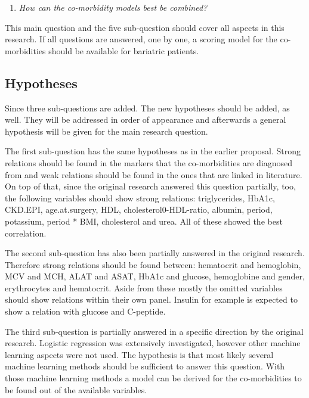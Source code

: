 \documentclass[10pt,a4paper]{article}
\begin{document}
	\begin{enumerate}[resume]
		\item \emph{How can the co-morbidity models best be combined?}
	\end{enumerate}
	
	This main question and the five sub-question should cover all aspects in this research. If all questions are answered, one by one, a scoring model for the co-morbidities should be available for bariatric patients.
	
	\subsection{Hypotheses}
	
	Since three sub-questions are added. The new hypotheses should be added, as well. They will be addressed in order of appearance and afterwards a general hypothesis will be given for the main research question.
	
	The first sub-question has the same hypotheses as in the earlier proposal. Strong relations should be found in the markers that the co-morbidities are diagnosed from and weak relations should be found in the ones that are linked in literature. On top of that, since the original research answered this question partially, too, the following variables should show strong relations: triglycerides, HbA1c, CKD.EPI, age.at.surgery, HDL, cholesterol0-HDL-ratio, albumin, period, potassium, period * BMI, cholesterol and urea. All of these showed the best correlation.
	
	The second sub-question has also been partially answered in the original research. Therefore strong relations should be found between: hematocrit and hemoglobin, MCV and MCH, ALAT and ASAT, HbA1c and glucose, hemoglobine and gender, erythrocytes and hematocrit. Aside from these mostly the omitted variables should show relations within their own panel. Insulin for example is expected to show a relation with glucose and C-peptide.
	
	The third sub-question is partially answered in a specific direction by the original research. Logistic regression was extensively investigated, however other machine learning aspects were not used. The hypothesis is that most likely several machine learning methods should be sufficient to answer this question. With those machine learning methods a model can be derived for the co-morbidities to be found out of the available variables.
	 
\end{document}
